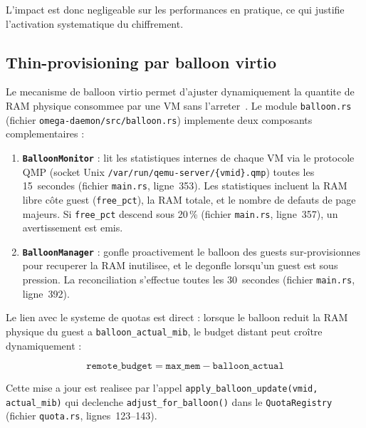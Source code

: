 L'impact est donc negligeable sur les performances en pratique, ce qui justifie l'activation systematique du chiffrement.

\subsection{Thin-provisioning par balloon virtio}
\label{subsec:balloon}

Le mecanisme de balloon virtio permet d'ajuster dynamiquement la quantite de RAM physique consommee par une VM sans l'arreter~\cite{qemu_balloon,waldspurger_2002}. Le module \texttt{balloon.rs} (fichier \texttt{omega-daemon/src/balloon.rs}) implemente deux composants complementaires :

\begin{enumerate}
    \item \textbf{\texttt{BalloonMonitor}} : lit les statistiques internes de chaque VM via le protocole QMP (socket Unix \texttt{/var/run/qemu-server/\{vmid\}.qmp}) toutes les 15~secondes (fichier \texttt{main.rs}, ligne~353). Les statistiques incluent la RAM libre c\^ote guest (\texttt{free\_pct}), la RAM totale, et le nombre de defauts de page majeurs. Si \texttt{free\_pct} descend sous 20\,\% (fichier \texttt{main.rs}, ligne~357), un avertissement est emis.

    \item \textbf{\texttt{BalloonManager}} : gonfle proactivement le balloon des guests sur-provisionnes pour recuperer la RAM inutilisee, et le degonfle lorsqu'un guest est sous pression. La reconciliation s'effectue toutes les 30~secondes (fichier \texttt{main.rs}, ligne~392).
\end{enumerate}

Le lien avec le systeme de quotas est direct : lorsque le balloon reduit la RAM physique du guest a \texttt{balloon\_actual\_mib}, le budget distant peut cro\^itre dynamiquement :

\begin{equation}
    \label{eq:balloon-quota}
    \texttt{remote\_budget} = \texttt{max\_mem} - \texttt{balloon\_actual}
\end{equation}

Cette mise a jour est realisee par l'appel \texttt{apply\_balloon\_update(vmid, actual\_mib)} qui declenche \texttt{adjust\_for\_balloon()} dans le \texttt{QuotaRegistry} (fichier \texttt{quota.rs}, lignes~123--143).

